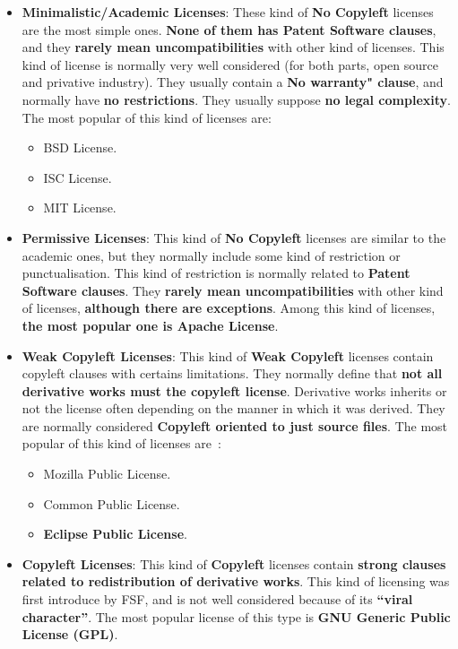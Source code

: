 \documentclass[a4paper, 12pt]{book}
\begin{document}
\begin{itemize}\itemsep0pt
 \item{\textbf{Minimalistic/Academic Licenses}}: These kind of \textbf{No Copyleft} licenses are the most simple ones. \textbf{None of them has Patent Software clauses}, and they \textbf{rarely mean uncompatibilities} with other kind of licenses. This kind of license is normally very well considered (for both parts, open source and privative industry). They usually contain a \textbf{No warranty" clause}, and normally have \textbf{no restrictions}. They usually suppose \textbf{no legal complexity}. The most popular of this kind of licenses are:
   \begin{itemize}\itemsep0pt
    \item{BSD License}.
    \item{ISC License}.
    \item{MIT License}.
   \end{itemize}
 \item{\textbf{Permissive Licenses}}: This kind of \textbf{No Copyleft} licenses are similar to the academic ones, but they normally include some kind of restriction or punctualisation. This kind of restriction is normally related to \textbf{Patent Software clauses}. They \textbf{rarely mean uncompatibilities} with other kind of licenses, \textbf{although there are exceptions}. Among this kind of licenses, \textbf{the most popular one is Apache License}.
 \item{\textbf{Weak Copyleft Licenses}}: This kind of \textbf{Weak Copyleft} licenses contain copyleft clauses with certains limitations. They normally define that \textbf{not all derivative works must the copyleft license}. Derivative works inherits or not the license often depending on the manner in which it was derived. They are normally considered \textbf{Copyleft oriented to just source files}. The most popular of this kind of licenses are~\cite{FSFLicense}:
   \begin{itemize}\itemsep0pt
    \item{Mozilla Public License}.
    \item{Common Public License}.
    \item{\textbf{Eclipse Public License}}.
   \end{itemize}
 \item{\textbf{Copyleft Licenses}}: This kind of \textbf{Copyleft} licenses contain \textbf{strong clauses related to redistribution of derivative works}. This kind of licensing was first introduce by FSF, and is not well considered because of its \textbf{``viral character''}. The most popular license of this type is \textbf{GNU Generic Public License (GPL)}.
\end{itemize}
\end{document}
